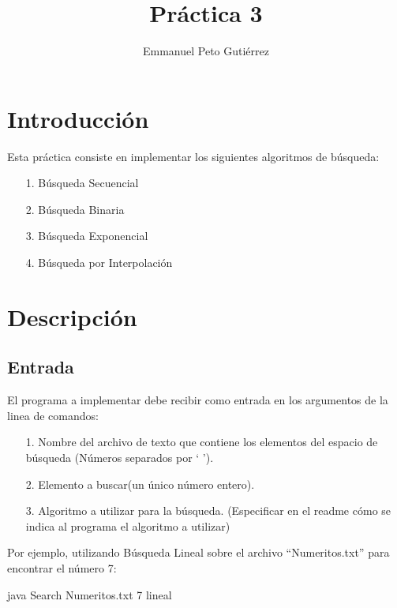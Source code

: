 \documentclass{article}
\title{Práctica 3}
\author{Emmanuel Peto Gutiérrez}
\begin{document}
\maketitle

\section{Introducción}

Esta práctica consiste en implementar los siguientes algoritmos de búsqueda:

\begin{itemize}

\item[1.] Búsqueda Secuencial

\item[2.] Búsqueda Binaria

\item[3.] Búsqueda Exponencial

\item[4.] Búsqueda por Interpolación

\end{itemize}

\section{Descripción}

\subsection{Entrada}

El programa a implementar debe recibir como entrada en los argumentos de la linea de comandos:

\begin{itemize}
\item[1.] Nombre del archivo de texto que contiene los elementos del espacio de
búsqueda (Números separados por ` ').
\item[2.] Elemento a buscar(un único número entero).
\item[3.] Algoritmo a utilizar para la búsqueda. (Especificar en el readme cómo se indica al programa el algoritmo a utilizar)
\end{itemize}

Por ejemplo, utilizando Búsqueda Lineal sobre el archivo ``Numeritos.txt'' para encontrar el número 7:

\begin{center}
java Search Numeritos.txt 7 lineal
\end{center}
\end{document}
